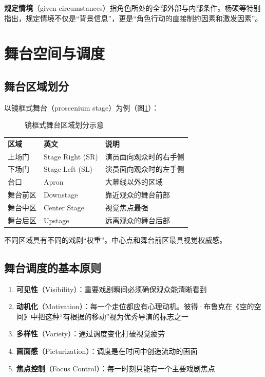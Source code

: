 \textbf{规定情境}（given circumstances）指角色所处的全部外部与内部条件。杨硕等特别指出，规定情境不仅是\enquote{背景信息}，更是\enquote{角色行动的直接制约因素和激发因素}\cite{yang:analysis}。

\section{舞台空间与调度}

\subsection{舞台区域划分}

以镜框式舞台（proscenium stage）为例（图\ref{fig:stage}）：

\begin{figure}[htbp]
\centering

\caption{镜框式舞台区域划分示意}
\label{fig:stage}
\end{figure}

\begin{tabular}{lll}
  \textbf{区域} & \textbf{英文} & \textbf{说明} \\
  上场门 & Stage Right (SR) & 演员面向观众时的右手侧 \\
  下场门 & Stage Left (SL) & 演员面向观众时的左手侧 \\
  台口 & Apron & 大幕线以外的区域 \\
  舞台前区 & Downstage & 靠近观众的舞台前部 \\
  舞台中区 & Center Stage & 视觉焦点最强 \\
  舞台后区 & Upstage & 远离观众的舞台后部 \\
\end{tabular}

不同区域具有不同的戏剧\enquote{权重}。中心点和舞台前区最具视觉权威感。

\subsection{舞台调度的基本原则}

\begin{enumerate}
  \item \textbf{可见性}（Visibility）：重要戏剧瞬间必须确保观众能清晰看到
  \item \textbf{动机化}（Motivation）：每一个走位都应有心理动机。彼得·布鲁克在《空的空间》中把这种\enquote{有根据的移动}视为优秀导演的标志之一\cite{brook:space}
  \item \textbf{多样性}（Variety）：通过调度变化打破视觉疲劳
  \item \textbf{画面感}（Picturization）：调度是在时间中创造流动的画面
  \item \textbf{焦点控制}（Focus Control）：每一时刻只能有一个主要戏剧焦点
\end{enumerate}

